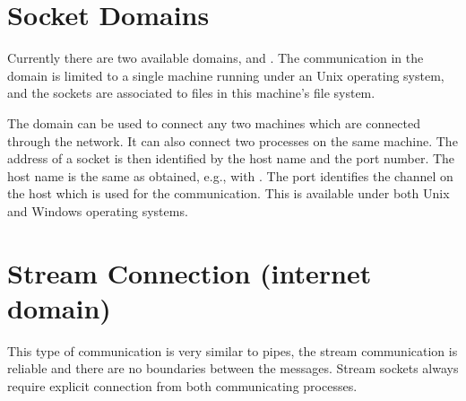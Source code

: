 \section{Socket Domains}
Currently there are two available domains,  and
.
The communication in the  domain is limited
to a single machine running under an Unix operating system, and the sockets
are associated
to files in this machine's file system.

The  domain can be used to connect any two machines
which are connected through the network. It can also connect two processes
on the same machine.
The address of a socket is then identified
by the host name and the port number.
The host name is the same as obtained, e.g., with
.
The port identifies the channel on the host which is used
for the communication. This is available under both Unix and Windows
operating systems.


\section{Stream Connection (internet domain)}
This type of communication is very similar to pipes,
the stream communication is reliable and there are no boundaries
between the messages.
Stream sockets always require explicit connection from both
communicating processes.

